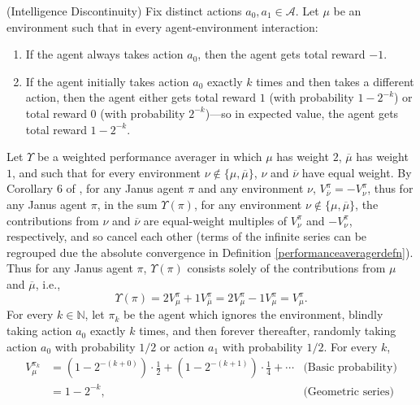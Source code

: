 \documentclass[runningheads]{llncs}
\begin{document}
\begin{example}
    (Intelligence Discontinuity)
    Fix distinct actions $a_0,a_1\in\mathcal A$.
    Let $\mu$ be an environment such that in every agent-environment interaction:
    \begin{enumerate}
        \item If the agent always takes action $a_0$, then the agent gets total reward $-1$.
        \item If the agent initially takes action $a_0$ exactly $k$ times and
            then takes a different action, then the agent either
            gets total reward $1$ (with probability $1-2^{-k}$)
            or total reward $0$ (with probability $2^{-k}$)---so in expected
            value, the agent gets total reward $1-2^{-k}$.
    \end{enumerate}
    Let $\Upsilon$ be a weighted performance averager in which $\mu$ has weight $2$,
    $\overline\mu$ has weight $1$, and such that for every
    environment $\nu\not\in\{\mu,\overline{\mu}\}$, $\nu$ and $\overline{\nu}$ have
    equal weight.
    By Corollary 6 of \cite{alexander2021reward}, for any Janus agent $\pi$ and
    any environment $\nu$, $V^\pi_{\overline\nu}=-V^\pi_{\nu}$, thus for any Janus agent $\pi$,
    in the sum $\Upsilon(\pi)$, for any environment $\nu\not\in\{\mu,\overline{\mu}\}$,
    the contributions from $\nu$ and $\overline\nu$ are equal-weight multiples of
    $V^\pi_{\nu}$ and $-V^\pi_{\nu}$,
    respectively, and so cancel each other
    (terms of the infinite series can be regrouped due the absolute convergence
    in Definition \ref{performanceaveragerdefn}).
    Thus for any Janus agent $\pi$,
    $\Upsilon(\pi)$ consists solely of the contributions from $\mu$ and $\overline\mu$,
    i.e.,
    \[
        \Upsilon(\pi)=2V^\pi_\mu+1V^\pi_{\overline\mu}
        =2V^\pi_\mu-1V^\pi_{\mu}=V^\pi_\mu.
    \]
    For every $k\in\mathbb N$, let $\pi_k$ be the agent which ignores the environment,
    blindly taking action $a_0$ exactly $k$ times, and then forever thereafter,
    randomly taking action $a_0$ with probability $1/2$ or action $a_1$ with probability
    $1/2$.
    For every $k$,
    \begin{align*}
        V^{\pi_k}_\mu
            &= (1-2^{-(k+0)})\cdot \mbox{$\frac12$}
                +(1-2^{-(k+1)})\cdot\mbox{$\frac14$} + \cdots
                    &\mbox{(Basic probability)}\\
            &= 1-2^{-k},
                    &\mbox{(Geometric series)}
    \end{align*}

\end{example}
\end{document}
